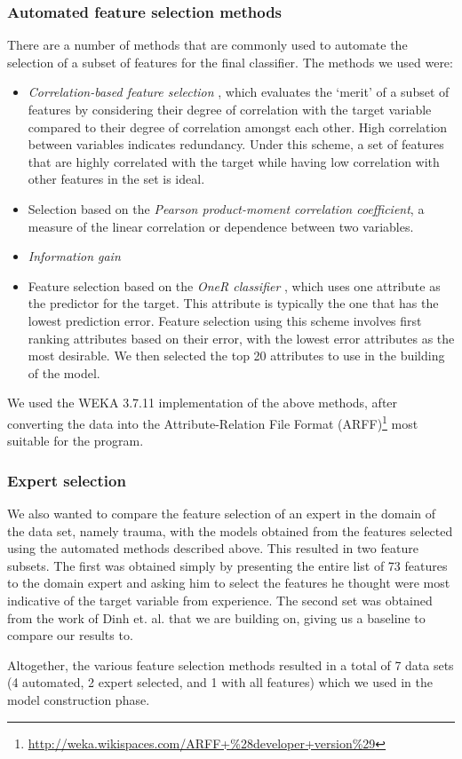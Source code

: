 \subsubsection{Automated feature selection methods}
There are a number of methods that are commonly used to automate the selection
of a subset of features for the final classifier. The methods we used were:
\begin{itemize}
  \item \textit{Correlation-based feature selection} \citep{Hall2000},
  which evaluates the `merit' of a
  subset of features by considering their degree of correlation with the target
  variable compared to their degree of correlation amongst each other. High
  correlation between variables indicates redundancy. Under
  this scheme, a set of features that are highly correlated with the target
  while having low correlation with other features in the set is ideal.
  \item Selection based on the
  \textit{Pearson product-moment correlation coefficient}, a measure of the
  linear correlation or dependence between two variables.
  \item \textit{Information gain} 
  \item Feature selection based on the \textit{OneR classifier}
  \citep{Holte1993}, which uses one
  attribute as the predictor for the target. This attribute is typically the one
  that has the lowest prediction error. Feature selection using this scheme
  involves first ranking attributes based on their error, with the lowest error
  attributes as the most desirable. We then selected the top 20 attributes to
  use in the building of the model.
\end{itemize}

We used the WEKA 3.7.11 \citep{Hall2009} implementation of the above
methods, after converting the data into the Attribute-Relation File Format
(ARFF)\footnote{\url{http://weka.wikispaces.com/ARFF+\%28developer+version\%29}}
most suitable for the program.

\subsubsection{Expert selection}
We also wanted to compare the feature selection of an expert in the domain
of the data set, namely trauma, with the models obtained from the features
selected using the automated methods described above. This resulted in two
feature subsets. The first was obtained simply by presenting the entire list
of 73 features to the domain expert and asking him to select the features he
thought were most indicative of the target variable from experience. The
second set was obtained from the work of Dinh et. al. \citep{Dinh2013a} that
we are building on, giving us a baseline to compare our results to.

Altogether, the various feature selection methods resulted in a total of
7 data sets (4 automated, 2 expert selected, and 1 with all features) which
we used in the model construction phase.


